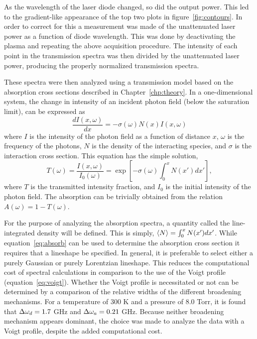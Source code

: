 As the wavelength of the laser diode changed, so did the output power. This led
to the gradient-like appearance of the top two plots in
figure~\ref{fig:contours}. In order to correct for this a measurement was made
of the unattenuated laser power as a function of diode wavelength. This was done by
deactivating the plasma and repeating the above acquisition procedure. The
intensity of each point in the transmission spectra was then divided by the
unattenuated laser power, producing the properly normalized transmission
spectra.

These spectra were then analyzed using a transmission model based on the
absorption cross sections described in Chapter~\ref{chp:theory}. In a
one-dimensional system, the change in intensity of an incident photon field
(below the saturation limit), can be expressed as
\begin{equation}
  \frac{dI(x, \omega)}{dx} = -\sigma(\omega) N(x) I(x, \omega)
\end{equation}
where $I$ is the intensity of the photon field as a function of distance $x$,
$\omega$ is the frequency of the photons, $N$ is the density of the interacting
species, and $\sigma$ is the interaction cross section. This equation has the
simple solution,
\begin{equation}
  T(\omega) = \frac{I(x, \omega)}{I_0(\omega)}
            = \exp\left[-\sigma(\omega) \int_0^x N(x') dx'\right],
  \label{eq:transmitted}
\end{equation}
where $T$ is the transmitted intensity fraction, and $I_0$ is the initial
intensity of the photon field. The absorption can be trivially obtained from the
relation $A(\omega) = 1 - T(\omega)$.

For the purpose of analyzing the absorption spectra, a quantity called the
line-integrated density will be defined. This is simply, $\langle N \rangle = \int_0^x
N(x')dx'$. While equation~\ref{eq:absorb} can be used to determine the
absorption cross section it requires that a lineshape be specified. In general,
it is preferable to select either a purely Gaussian or purely Lorentzian
lineshape. This reduces the computational cost of spectral calculations in
comparison to the use of the Voigt profile (equation~\ref{eq:voigt}). Whether
the Voigt profile is necessitated or not can be determined by a comparison of
the relative widths of the different broadening mechanisms. For a temperature of
300 K and a pressure of 8.0 Torr, it is found that $\Delta \omega_d = 1.7$ GHz and $\Delta \omega_a =
0.21$ GHz. Because neither broadening mechanism appears dominant, the choice was
made to analyze the data with a Voigt profile, despite the added computational
cost.

